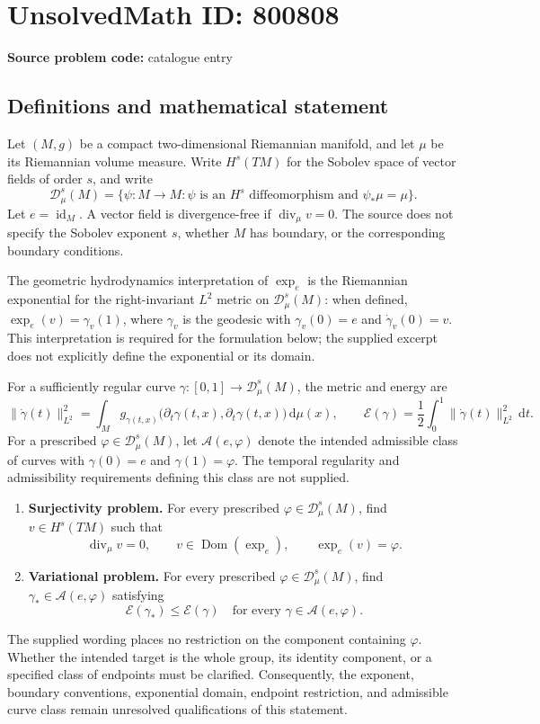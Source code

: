 \documentclass[11pt]{article}
\begin{document}
\section*{UnsolvedMath ID: 800808}
\textbf{Source problem code:} catalogue entry
\subsection{Definitions and mathematical statement}
Let \((M,g)\) be a compact two-dimensional Riemannian manifold, and let \(\mu\) be its Riemannian volume measure. Write \(H^s(TM)\) for the Sobolev space of vector fields of order \(s\), and write
\[
\mathscr D_\mu^s(M)=\{\psi:M\to M:\psi\text{ is an }H^s\text{ diffeomorphism and }\psi_*\mu=\mu\}.
\]
Let \(e=\operatorname{id}_M\). A vector field is divergence-free if \(\operatorname{div}_\mu v=0\). The source does not specify the Sobolev exponent \(s\), whether \(M\) has boundary, or the corresponding boundary conditions.

The geometric hydrodynamics interpretation of \(\exp_e\) is the Riemannian exponential for the right-invariant \(L^2\) metric on \(\mathscr D_\mu^s(M)\): when defined, \(\exp_e(v)=\gamma_v(1)\), where \(\gamma_v\) is the geodesic with \(\gamma_v(0)=e\) and \(\dot\gamma_v(0)=v\). This interpretation is required for the formulation below; the supplied excerpt does not explicitly define the exponential or its domain.

For a sufficiently regular curve \(\gamma:[0,1]\to\mathscr D_\mu^s(M)\), the metric and energy are
\[
\|\dot\gamma(t)\|_{L^2}^2
=\int_M g_{\gamma(t,x)}\bigl(\partial_t\gamma(t,x),\partial_t\gamma(t,x)\bigr)\,\mathrm d\mu(x),
\qquad
\mathcal E(\gamma)=\frac12\int_0^1\|\dot\gamma(t)\|_{L^2}^2\,\mathrm dt.
\]
For a prescribed \(\varphi\in\mathscr D_\mu^s(M)\), let \(\mathcal A(e,\varphi)\) denote the intended admissible class of curves with \(\gamma(0)=e\) and \(\gamma(1)=\varphi\). The temporal regularity and admissibility requirements defining this class are not supplied.

\begin{enumerate}
\item \textbf{Surjectivity problem.} For every prescribed \(\varphi\in\mathscr D_\mu^s(M)\), find \(v\in H^s(TM)\) such that
\[
\operatorname{div}_\mu v=0,\qquad v\in\operatorname{Dom}(\exp_e),\qquad \exp_e(v)=\varphi.
\]
\item \textbf{Variational problem.} For every prescribed \(\varphi\in\mathscr D_\mu^s(M)\), find \(\gamma_*\in\mathcal A(e,\varphi)\) satisfying
\[
\mathcal E(\gamma_*)\leq\mathcal E(\gamma)
\quad\text{for every }\gamma\in\mathcal A(e,\varphi).
\]
\end{enumerate}
The supplied wording places no restriction on the component containing \(\varphi\). Whether the intended target is the whole group, its identity component, or a specified class of endpoints must be clarified. Consequently, the exponent, boundary conventions, exponential domain, endpoint restriction, and admissible curve class remain unresolved qualifications of this statement.
\end{document}
